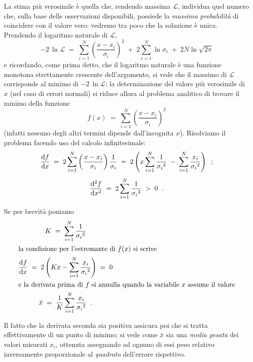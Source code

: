 La stima pi\`u verosimile \`e quella che, rendendo massima
$\mathcal{L}$, individua quel numero che, sulla base delle
osservazioni disponibili, possiede la \emph{massima
  probabilit\`a} di coincidere con il valore vero: vedremo
tra poco che la soluzione \`e unica.  Prendendo il logaritmo
naturale di $\mathcal{L}$,
\begin{equation*}
  - 2 \, \ln\mathcal{L} \; = \;
  \sum_{i=1}^N \left( \frac{x - x_i}{\sigma_i}
  \right) ^2 \; + \; 2 \sum_{i=1}^N \ln \sigma_i
  \; + \; 2 N \ln \sqrt{2 \pi}
\end{equation*}
e ricordando, come prima detto, che il logaritmo naturale
\`e una funzione monotona strettamente crescente
dell'argomento, si vede che il massimo di $\mathcal{L}$
corrisponde al minimo di $-2 \, \ln \mathcal{L}$; la
determinazione del valore pi\`u verosimile di $x$ (nel caso
di errori normali) si riduce allora al problema analitico di
trovare il minimo della funzione
\begin{equation*}
  f(x) \; = \; \sum_{i=1}^{N} \left(
    \frac{ x - x_{i} }{ \sigma_{i} } \right) ^{2}
\end{equation*}
(infatti nessuno degli altri termini dipende dall'incognita
$x$).  Risolviamo il problema facendo uso del calcolo
infinitesimale:
\begin{gather*}
  \frac{\mathrm{d} f}{\mathrm{d} x} \; = \; 2 \sum_{i=1}^{N}
    \left( \frac{x - x_{i}}{ \sigma_{i} } \right)
    \frac{1}{\sigma_{i}} \; = \; 2 \left( x
    \sum_{i=1}^{N} \frac{1}{ {\sigma_i}^2 }
    \; - \; \sum_{i=1}^{N} \frac{x_i}{{\sigma_i}^2}
    \right) \;\; ; \\[1ex]
  \frac{\mathrm{d}^2 f}{\mathrm{d} x^2} \; = \; 2 \sum_{i=1}^{N}
    \frac{1}{ {\sigma_i}^2 } \; > \; 0 \;\; .
\end{gather*}

Se per brevit\`a poniamo
\begin{gather}
  K \; = \; \sum_{i=1}^{N} \frac{1}{{\sigma_i}^2}
    \notag \\
  \intertext{la condizione per l'estremante di
    $f(x)$ si scrive}
  \frac{\de f}{\de x} \; = \; 2 \left( K x -
    \sum_{i=1}^{N} \frac{x_i}{{\sigma_i}^2} \right)
    \; = \; 0 \notag \\
  \intertext{e la derivata prima di $f$ si annulla
    quando la variabile $x$ assume il valore}%
  \index{media!pesata|(emidx}
  \bar x \; = \; \frac{1}{K} \sum_{i=1}^{N}
   \frac{x_i}{{\sigma_i}^2} \peq . \label{eq:11.medpes}
\end{gather}

Il fatto che la derivata seconda sia positiva assicura poi
che si tratta effettivamente di un punto di minimo; si vede
come $\bar x$ sia una \emph{media pesata} dei valori
misurati $x_i$, ottenuta assegnando ad ognuno di essi peso
relativo inversamente proporzionale al \emph{quadrato}
dell'errore rispettivo.

